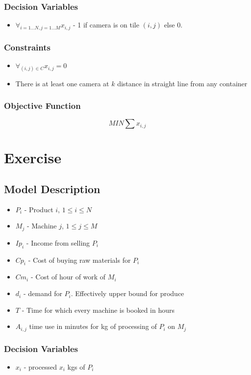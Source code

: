 \documentclass[11pt]{article}
\begin{document}
\subsubsection*{Decision Variables}
\begin{itemize}
    \item $\forall_{i=1\hdots N, j=1 \hdots M} x_{i, j}$ - 1 if camera is on tile $(i, j)$ else 0. 
\end{itemize}
\subsubsection*{Constraints}
\begin{itemize}
    \item $\forall_{(i, j) \in C} x_{i, j} = 0 $
    \item There is at least one camera at $k$ distance in straight line from any container
\end{itemize}
\subsubsection*{Objective Function}
$$ MIN \sum x_{i, j} $$

\section{Exercise}
\subsection{Model Description}
\begin{itemize}
    \item $P_i$ - Product $i$, $1 \leq i \leq N$
    \item $M_j$ - Machine $j$, $1 \leq j \leq M$
    \item $Ip_i$ - Income from selling $P_i$
    \item $Cp_i$ - Cost of buying raw materials for $P_i$
    \item $Cm_i$ - Cost of hour of work of $M_i$
    \item $d_i$ - demand for $P_i$. Effectively upper bound for produce
    \item $T$ - Time for which every machine is booked in hours
    \item $A_{i, j}$ time use in minutes for kg of processing of $P_i$ on $M_j$
\end{itemize}
\subsubsection*{Decision Variables}
\begin{itemize}
    \item $ x_i $ - processed $x_i$ kgs of $P_i$ 
\end{itemize}
\end{document}
